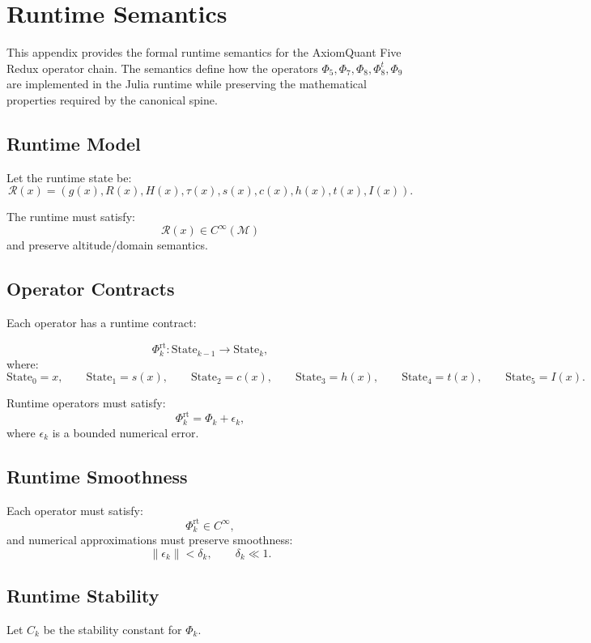 \section{Runtime Semantics}
\label{sec:runtimesemantics}

This appendix provides the formal runtime semantics for the AxiomQuant Five
Redux operator chain. The semantics define how the operators $\Phi_5, \Phi_7,
\Phi_8, \Phi_8^t, \Phi_9$ are implemented in the Julia runtime while preserving
the mathematical properties required by the canonical spine.

\subsection{Runtime Model}

Let the runtime state be:
\[
\mathcal{R}(x) = (g(x), R(x), H(x), \tau(x), s(x), c(x), h(x), t(x), I(x)).
\]

The runtime must satisfy:
\[
\mathcal{R}(x) \in C^\infty(\mathcal{M})
\]
and preserve altitude/domain semantics.

\subsection{Operator Contracts}

Each operator has a runtime contract:

\[
\Phi_k^{\text{rt}} : \text{State}_{k-1} \to \text{State}_k,
\]
where:
\[
\text{State}_0 = x,
\qquad
\text{State}_1 = s(x),
\qquad
\text{State}_2 = c(x),
\qquad
\text{State}_3 = h(x),
\qquad
\text{State}_4 = t(x),
\qquad
\text{State}_5 = I(x).
\]

Runtime operators must satisfy:
\[
\Phi_k^{\text{rt}} = \Phi_k + \epsilon_k,
\]
where $\epsilon_k$ is a bounded numerical error.

\subsection{Runtime Smoothness}

Each operator must satisfy:
\[
\Phi_k^{\text{rt}} \in C^\infty,
\]
and numerical approximations must preserve smoothness:
\[
\| \epsilon_k \| < \delta_k,
\qquad
\delta_k \ll 1.
\]

\subsection{Runtime Stability}

Let $C_k$ be the stability constant for $\Phi_k$.

